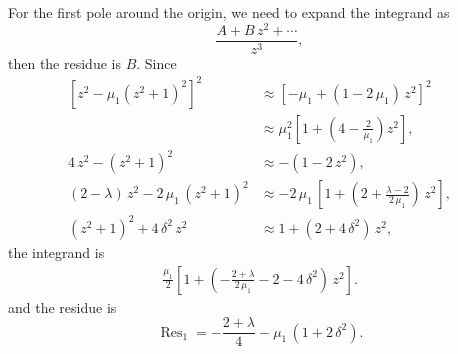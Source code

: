 \documentclass[preprint, floatfix]{revtex4-1}
\begin{document}
{For the first pole around the origin,
we need to expand the integrand as
$$
\frac{ A + B \, z^2 + \cdots }
     {          z^3          },
$$
then the residue is $B$.
%
Since
$$
\begin{aligned}
\left[ z^2 - \mu_1 (z^2 + 1)^2 \right]^2
&
\approx
[ - \mu_1 + (1 - 2 \, \mu_1) \, z^2]^2
\\
&
\approx
\mu_1^2
\left[
  1 + \left(4 - \tfrac { 2  } { \mu_1 } \right) z^2
\right],
\\
%
4 \, z^2 - ( z^2 + 1 )^2
&
\approx
-( 1 - 2 \, z^2 ),
\\
%
(2 - \lambda) \, z^2 - 2 \, \mu_1 \, (z^2 + 1)^2
&
\approx
-2 \, \mu_1 \,
\left[
  1 + \left(
        2 + \tfrac{ \lambda - 2 } { 2 \, \mu_1 }
      \right)
      \, z^2
\right],
\\
%
( z^2 + 1 )^2 + 4 \, \delta^2 \, z^2
&
\approx
1 + (2 + 4 \, \delta^2) \, z^2,
\end{aligned}
$$
the integrand is
$$
\begin{aligned}
\frac{ \mu_1 }
     {   2   }
\left[
  1 + \left(
        - \frac{ 2 + \lambda } { 2 \, \mu_1 }
        - 2 - 4 \, \delta^2
      \right) \, z^2
\right].
\end{aligned}
$$
and the residue is
$$
\operatorname{Res}_1
=
  - \frac{ 2 + \lambda } { 4 }
  - \mu_1 \, \left( 1 + 2 \, \delta^2 \right).
$$


}
\end{document}
